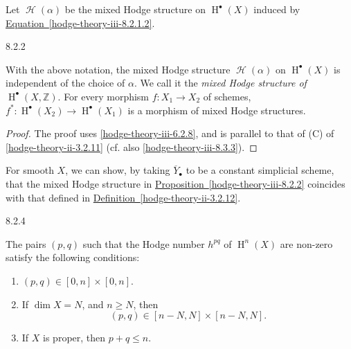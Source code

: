     Let \(\operatorname {\mathscr {H}}(\alpha )\) be the mixed Hodge structure on \(\operatorname {H}^\bullet (X)\) induced by \hyperref[hodge-theory-iii-8.2.1.2]{Equation~\ref*{hodge-theory-iii-8.2.1.2}}.\begin{proposition}{8.2.2}\label{hodge-theory-iii-8.2.2}\skipsinglepar\par{}With the above notation, the mixed Hodge structure \(\operatorname {\mathscr {H}}(\alpha )\) on \(\operatorname {H}^\bullet (X)\) is independent of the choice of \(\alpha \).
    We call it the \emph{mixed Hodge structure of \(\operatorname {H}^\bullet (X,\mathbb {Z})\)}.
    For every morphism \(f\colon  X_1\to  X_2\) of schemes, \(f^*\colon \operatorname {H}^\bullet (X_2)\to \operatorname {H}^\bullet (X_1)\) is a morphism of mixed Hodge structures.\begin{proof}\par{}The proof uses \cref{hodge-theory-iii-6.2.8}, and is parallel to that of (C) of \cref{hodge-theory-ii-3.2.11} (cf. also \cref{hodge-theory-iii-8.3.3}).\end{proof}\end{proposition}\label{hodge-theory-iii-8.2.3}\par{}For smooth \(X\), we can show, by taking \(\overline {Y}_\bullet \) to be a constant simplicial scheme, that the mixed Hodge structure in \hyperref[hodge-theory-iii-8.2.2]{Proposition~\ref*{hodge-theory-iii-8.2.2}} coincides with that defined in \hyperref[hodge-theory-ii-3.2.12]{Definition~\ref*{hodge-theory-ii-3.2.12}}.\begin{theorem}{8.2.4}\label{hodge-theory-iii-8.2.4}\skipsinglepar\par{}The pairs \((p,q)\) such that the Hodge number \(h^{pq}\) of \(\operatorname {H}^n(X)\) are non-zero satisfy the following conditions:

    
 \begin{enumerate}
      
 \item[(i)]
        \((p,q)\in [0,n]\times [0,n]\).
      


      
 \item[(ii)]
        If \(\dim  X=N\), and \(n\geqslant  N\), then
        \[           (p,q)\in [n-N,N]\times [n-N,N].         \]
      


      
 \item[(iii)]
        If \(X\) is proper, then \(p+q\leqslant  n\).
      



\end{enumerate}
\end{theorem}
